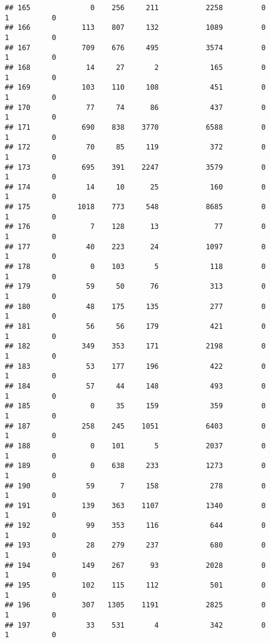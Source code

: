 \documentclass[
]{article}
\begin{document}
\begin{verbatim}
## 165              0    256     211           2258         0         1          0
## 166            113    807     132           1089         0         1          0
## 167            709    676     495           3574         0         1          0
## 168             14     27       2            165         0         1          0
## 169            103    110     108            451         0         1          0
## 170             77     74      86            437         0         1          0
## 171            690    838    3770           6588         0         1          0
## 172             70     85     119            372         0         1          0
## 173            695    391    2247           3579         0         1          0
## 174             14     10      25            160         0         1          0
## 175           1018    773     548           8685         0         1          0
## 176              7    128      13             77         0         1          0
## 177             40    223      24           1097         0         1          0
## 178              0    103       5            118         0         1          0
## 179             59     50      76            313         0         1          0
## 180             48    175     135            277         0         1          0
## 181             56     56     179            421         0         1          0
## 182            349    353     171           2198         0         1          0
## 183             53    177     196            422         0         1          0
## 184             57     44     148            493         0         1          0
## 185              0     35     159            359         0         1          0
## 187            258    245    1051           6403         0         1          0
## 188              0    101       5           2037         0         1          0
## 189              0    638     233           1273         0         1          0
## 190             59      7     158            278         0         1          0
## 191            139    363    1107           1340         0         1          0
## 192             99    353     116            644         0         1          0
## 193             28    279     237            680         0         1          0
## 194            149    267      93           2028         0         1          0
## 195            102    115     112            501         0         1          0
## 196            307   1305    1191           2825         0         1          0
## 197             33    531       4            342         0         1          0

\end{verbatim}
\end{document}
